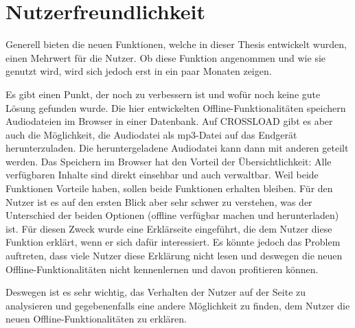 \section{Nutzerfreundlichkeit}
Generell bieten die neuen Funktionen, welche in dieser Thesis entwickelt wurden, einen Mehrwert für die Nutzer. Ob diese Funktion angenommen und wie sie genutzt wird, wird sich jedoch erst in ein paar Monaten zeigen. 

Es gibt einen Punkt, der noch zu verbessern ist und wofür noch keine gute Lösung gefunden wurde. Die hier entwickelten Offline-Funktionalitäten speichern Audiodateien im Browser in einer Datenbank. Auf CROSSLOAD gibt es aber auch die Möglichkeit, die Audiodatei als mp3-Datei auf das Endgerät herunterzuladen. Die heruntergeladene Audiodatei kann dann mit anderen geteilt werden. Das Speichern im Browser hat den Vorteil der Übersichtlichkeit: Alle verfügbaren Inhalte sind direkt einsehbar und auch verwaltbar. Weil beide Funktionen Vorteile haben, sollen beide Funktionen erhalten bleiben. Für den Nutzer ist es auf den ersten Blick aber sehr schwer zu verstehen, was der Unterschied der beiden Optionen (offline verfügbar machen und herunterladen) ist. Für diesen Zweck wurde eine Erklärseite eingeführt, die dem Nutzer diese Funktion erklärt, wenn er sich dafür interessiert. Es könnte jedoch das Problem auftreten, dass viele Nutzer diese Erklärung nicht lesen und deswegen die neuen Offline-Funktionalitäten nicht kennenlernen und davon profitieren können. 

Deswegen ist es sehr wichtig, das Verhalten der Nutzer auf der Seite zu analysieren und gegebenenfalls eine andere Möglichkeit zu finden, dem Nutzer die neuen Offline-Funktionalitäten zu erklären.
